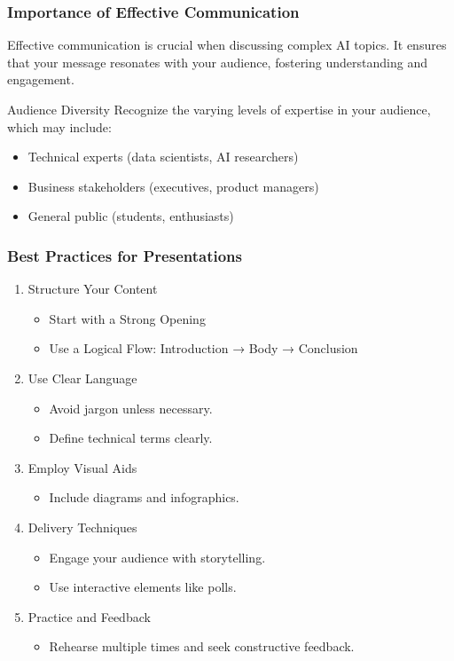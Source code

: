 \documentclass[aspectratio=169]{beamer}
\begin{document}
\begin{frame}[fragile]
    \frametitle{Importance of Effective Communication}
    Effective communication is crucial when discussing complex AI topics. It ensures that your message resonates with your audience, fostering understanding and engagement. 

    \begin{block}{Audience Diversity}
        Recognize the varying levels of expertise in your audience, which may include:
        \begin{itemize}
            \item Technical experts (data scientists, AI researchers)
            \item Business stakeholders (executives, product managers)
            \item General public (students, enthusiasts)
        \end{itemize}
    \end{block}
\end{frame}

\begin{frame}[fragile]
    \frametitle{Best Practices for Presentations}
    \begin{enumerate}
        \item Structure Your Content
            \begin{itemize}
                \item Start with a Strong Opening
                \item Use a Logical Flow: Introduction → Body → Conclusion
            \end{itemize}
        \item Use Clear Language
            \begin{itemize}
                \item Avoid jargon unless necessary.
                \item Define technical terms clearly.
            \end{itemize}
        \item Employ Visual Aids
            \begin{itemize}
                \item Include diagrams and infographics.
            \end{itemize}
        \item Delivery Techniques
            \begin{itemize}
                \item Engage your audience with storytelling.
                \item Use interactive elements like polls.
            \end{itemize}
        \item Practice and Feedback
            \begin{itemize}
                \item Rehearse multiple times and seek constructive feedback.
            \end{itemize}
    \end{enumerate}
\end{frame}
\end{document}
